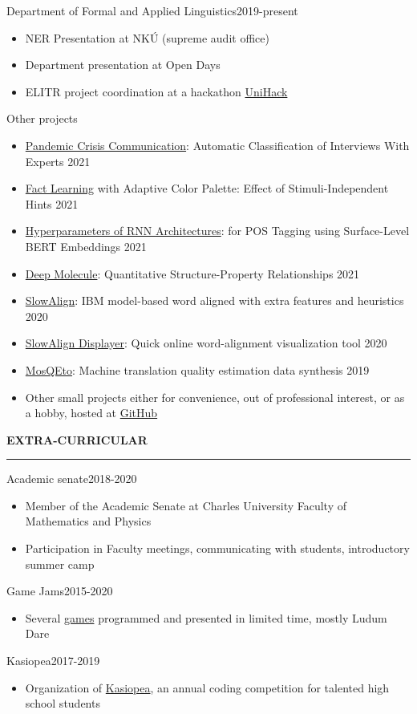 \documentclass[11pt,a4paper]{article} %
\newcommand{\hSection}[1]{
    \medskip
    \MakeUppercase{\bf #1}
    \medskip
    \hrule
}
\newcommand{\hSubsectionItemize}[3]{
    {#1}\hfill {\footnotesize #2}\hspace{-1cm}\\
    \vspace{-0.5cm}
    \begin{itemize} \footnotesize #3 \end{itemize}
    \vspace{0.3\baselineskip}
}
\begin{document}
\hSubsectionItemize
{Department of Formal and Applied Linguistics}
{2019-present}
{
\item NER Presentation at NKÚ (supreme audit office)
\item Department presentation at Open Days
\item ELITR project coordination at a hackathon \href{https://elitr.eu/unihack-2020/}{UniHack}
}

\hSubsectionItemize
{Other projects}
{}
{
\item \href{https://github.com/zouharvi/multichannel-management}{Pandemic Crisis Communication}: Automatic Classification of Interviews With Experts \hfill {2021}
\item \href{https://github.com/zouharvi/user-models}{Fact Learning} with Adaptive Color Palette: Effect of Stimuli-Independent Hints \hfill {2021}
\item \href{https://github.com/zouharvi/rnn-bert-pos}{Hyperparameters of RNN Architectures}: for POS Tagging using Surface-Level BERT Embeddings \hfill {2021}
\item \href{https://github.com/zouharvi/deep-molecule-qspr}{Deep Molecule}: Quantitative Structure-Property Relationships \hfill {2021}
\item \href{https://github.com/zouharvi/SlowAlign}{SlowAlign}: 
IBM model-based word aligned with extra features and heuristics \hfill{2020}
\item \href{https://vilda.net/s/slowalign/}{SlowAlign Displayer}: Quick online word-alignment visualization tool \hfill {2020}
\item \href{https://github.com/zouharvi/MosQEto}{MosQEto}: Machine translation quality estimation data synthesis \hfill {2019}
\item Other small projects either for convenience, out of professional interest, or as a hobby, hosted at \href{https://github.com/zouharvi}{GitHub}
}



\hSection{Extra-Curricular}
\hSubsectionItemize
{Academic senate}
{2018-2020}
{
\item Member of the Academic Senate at Charles University Faculty of Mathematics and Physics
\item Participation in Faculty meetings, communicating with students, introductory summer camp 
}

\hSubsectionItemize
{Game Jams}
{2015-2020}
{
\item Several \href{https://github.com/allemansratten}{games} programmed and presented in limited time, mostly Ludum Dare
}

\hSubsectionItemize
{Kasiopea}
{2017-2019}
{
\item Organization of \href{https://kasiopea.matfyz.cz/}{Kasiopea}, an annual coding competition for talented high school students
}
\end{document}
